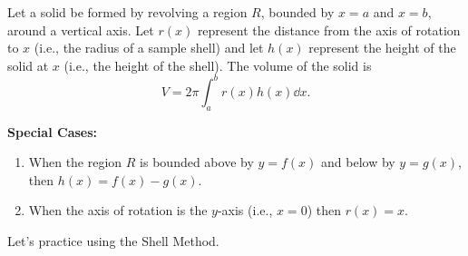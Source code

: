 \bigskip

\begin{keyidea}\label{idea:shell_method}
Let a solid be formed by revolving a region $R$, bounded by $x=a$ and $x=b$, around a vertical axis. Let $r(x)$ represent the distance from the axis of rotation to $x$ (i.e., the radius of a sample shell) and let $h(x)$ represent the height of the solid at $x$ (i.e., the height of the shell). The volume of the solid is 
\[V = 2\pi\int_a^b r(x)h(x)\dd x.\]
\end{keyidea}

\textbf{Special Cases:}
	\begin{enumerate}
	\item		When the region $R$ is bounded above by $y=f(x)$ and below by $y=g(x)$, then $h(x) = f(x)-g(x)$.
	\item		When the axis of rotation is the $y$-axis (i.e., $x=0$) then $r(x) = x$.
	\end{enumerate}


Let's practice using the Shell Method.

